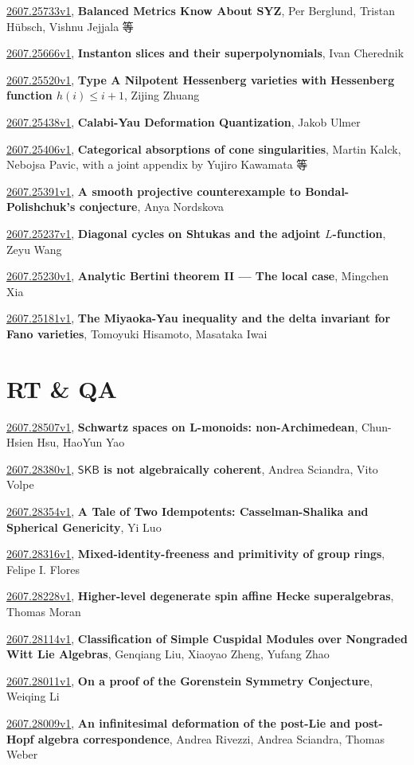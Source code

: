\documentclass[9pt, a4paper]{article}
\theoremstyle{plain}
\theoremstyle{definition}
\theoremstyle{remark}
\newcommand{\arxiv}[3]{\href{https://arxiv.org/abs/#1}{#1}, \textbf{\textcolor{arxivblue}{#2}}, #3}
\begin{document}
\arxiv{2607.25733v1}{Balanced Metrics Know About SYZ}{Per Berglund, Tristan Hübsch, Vishnu Jejjala 等}

\arxiv{2607.25666v1}{Instanton slices and their superpolynomials}{Ivan Cherednik}

\arxiv{2607.25520v1}{Type A Nilpotent Hessenberg varieties with Hessenberg function $h(i)\le i+1$}{Zijing Zhuang}

\arxiv{2607.25438v1}{Calabi-Yau Deformation Quantization}{Jakob Ulmer}

\arxiv{2607.25406v1}{Categorical absorptions of cone singularities}{Martin Kalck, Nebojsa Pavic, with a joint appendix by Yujiro Kawamata 等}

\arxiv{2607.25391v1}{A smooth projective counterexample to Bondal-Polishchuk's conjecture}{Anya Nordskova}

\arxiv{2607.25237v1}{Diagonal cycles on Shtukas and the adjoint $L$-function}{Zeyu Wang}

\arxiv{2607.25230v1}{Analytic Bertini theorem II --- The local case}{Mingchen Xia}

\arxiv{2607.25181v1}{The Miyaoka-Yau inequality and the delta invariant for Fano varieties}{Tomoyuki Hisamoto, Masataka Iwai}


\section{RT \& QA}
\arxiv{2607.28507v1}{Schwartz spaces on L-monoids: non-Archimedean}{Chun-Hsien Hsu, HaoYun Yao}

\arxiv{2607.28380v1}{$\mathsf{SKB}$ is not algebraically coherent}{Andrea Sciandra, Vito Volpe}

\arxiv{2607.28354v1}{A Tale of Two Idempotents: Casselman-Shalika and Spherical Genericity}{Yi Luo}

\arxiv{2607.28316v1}{Mixed-identity-freeness and primitivity of group rings}{Felipe I. Flores}

\arxiv{2607.28228v1}{Higher-level degenerate spin affine Hecke superalgebras}{Thomas Moran}

\arxiv{2607.28114v1}{Classification of Simple Cuspidal Modules over Nongraded Witt Lie Algebras}{Genqiang Liu, Xiaoyao Zheng, Yufang Zhao}

\arxiv{2607.28011v1}{On a proof of the Gorenstein Symmetry Conjecture}{Weiqing Li}

\arxiv{2607.28009v1}{An infinitesimal deformation of the post-Lie and post-Hopf algebra correspondence}{Andrea Rivezzi, Andrea Sciandra, Thomas Weber}
\end{document}
